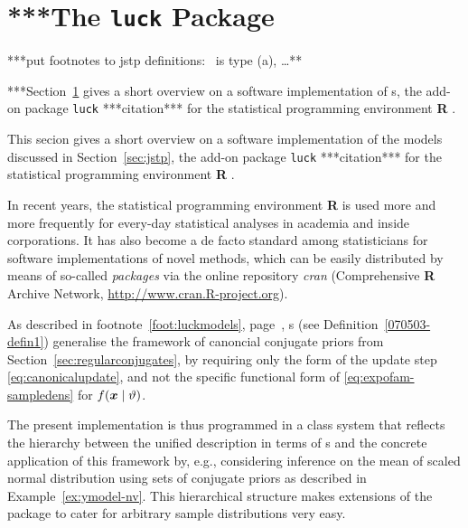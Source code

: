 \section{***The \texttt{luck} Package} %
\label{sec:luck}


***put footnotes to jstp definitions: \ymodel\ is type (a), \ldots***

***Section~\ref{sec:luck} gives a short overview on a software implementation of \nymodel s,
the add-on package \texttt{luck} ***citation*** for the statistical programming environment \textbf{R} \parencite{2013:r}.

This secion gives a short overview on a software implementation of the models discussed in Section~\ref{sec:jstp},
the add-on package \texttt{luck} ***citation*** for the statistical programming environment \textbf{R} \parencite{2013:r}.

In recent years, the statistical programming environment %
\textbf{R} is used more and more frequently for every-day statistical analyses
in academia and inside corporations. %
It has also become a de facto standard among
statisticians for software implementations of novel methods,
which can be easily distributed by means of so-called \emph{packages}
via the online repository \emph{cran} (Comprehensive \textbf{R} Archive Network, \url{http://www.cran.R-project.org}).

As described in footnote~\ref{foot:luckmodels}, page~\pageref{foot:luckmodels},
\model s (see Definition~\ref{070503-defin1}) generalise the framework
of canoncial conjugate priors from Section~\ref{sec:regularconjugates},
by requiring only the form of the update step \eqref{eq:canonicalupdate},
and not the specific functional form of \eqref{eq:expofam-sampledens} for $f({\bm x} \mid \vartheta)$.

The present implementation is thus programmed in a class system
that reflects %
the hierarchy between the unified description in terms of \model s %
and the concrete application of this framework by, e.g.,
considering inference on the mean of scaled normal distribution using sets of conjugate priors
as described in Example~\ref{ex:ymodel-nv}.
This hierarchical structure makes extensions of the package
to cater for arbitrary sample distributions very easy.

